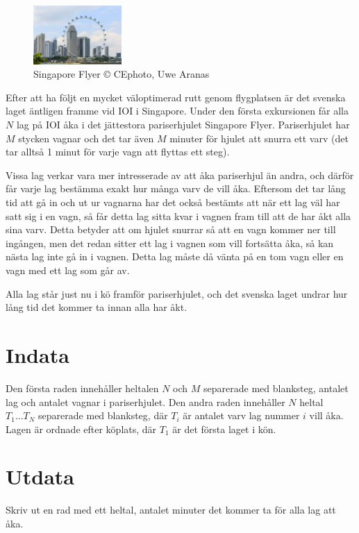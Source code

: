 \begin{figure}
	\includegraphics[width=0.3\textwidth]{image}
	\caption{\centering Singapore Flyer \newline © CEphoto, Uwe Aranas}
\end{figure}

Efter att ha följt en mycket väloptimerad rutt genom flygplatsen är det svenska laget äntligen framme vid IOI i Singapore.
Under den första exkursionen får alla $N$ lag på IOI åka i det jättestora pariserhjulet Singapore Flyer.
Pariserhjulet har $M$ stycken vagnar och det tar även $M$ minuter för hjulet att snurra ett varv
(det tar alltså 1 minut för varje vagn att flyttas ett steg).

Vissa lag verkar vara mer intresserade av att åka pariserhjul än andra, och därför får varje lag bestämma exakt hur många varv de vill åka.
Eftersom det tar lång tid att gå in och ut ur vagnarna har det också bestämts att när ett lag väl har satt sig
i en vagn, så får detta lag sitta kvar i vagnen fram till att de har åkt alla sina varv.
Detta betyder att om hjulet snurrar så att en vagn kommer ner till ingången, men det redan sitter ett lag i vagnen som vill fortsätta åka,
så kan nästa lag inte gå in i vagnen. Detta lag måste då vänta på en tom vagn eller en vagn med ett lag som går av.

Alla lag står just nu i kö framför pariserhjulet, och det svenska laget undrar hur lång tid det kommer ta innan alla har åkt.

\section*{Indata}
Den första raden innehåller heltalen $N$ och $M$ separerade med blanksteg,
antalet lag och antalet vagnar i pariserhjulet.
Den andra raden innehåller $N$ heltal $T_1 ... T_N$ separerade med blanksteg,
där $T_i$ är antalet varv lag nummer $i$ vill åka. Lagen är ordnade efter
köplats, där $T_1$ är det första laget i kön.

\section*{Utdata}
Skriv ut en rad med ett heltal, antalet minuter det kommer ta för alla lag att åka.

